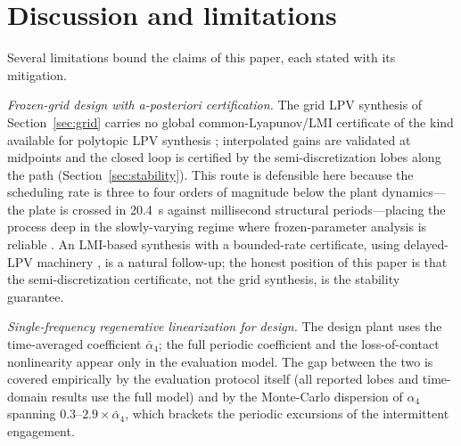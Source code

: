 \documentclass[preprint,12pt]{elsarticle}
\begin{document}
\section{Discussion and limitations}
\label{sec:discussion}

Several limitations bound the claims of this paper, each stated with
its mitigation.

\emph{Frozen-grid design with a-posteriori certification.} The grid LPV
synthesis of Section~\ref{sec:grid} carries no global
common-Lyapunov/LMI certificate of the kind available for polytopic LPV
synthesis \cite{apkarian1995self,desouza2022gain}; interpolated gains
are validated at midpoints and the closed loop is certified by the
semi-discretization lobes along the path
(Section~\ref{sec:stability}). This route is defensible here because
the scheduling rate is three to four orders of magnitude below the
plant dynamics---the plate is crossed in 20.4~s against millisecond
structural periods---placing the process deep in the slowly-varying
regime where frozen-parameter analysis is reliable
\cite{shamma1991guaranteed,rugh2000research,hoffmann2015survey}. An
LMI-based synthesis with a bounded-rate certificate, using delayed-LPV
machinery \cite{desouza2022gain}, is a natural follow-up; the honest
position of this paper is that the semi-discretization certificate, not
the grid synthesis, is the stability guarantee.

\emph{Single-frequency regenerative linearization for design.} The
design plant uses the time-averaged coefficient $\bar{\alpha}_4$; the
full periodic coefficient and the loss-of-contact nonlinearity appear
only in the evaluation model. The gap between the two is covered
empirically by the evaluation protocol itself (all reported lobes and
time-domain results use the full model) and by the Monte-Carlo
dispersion of $\alpha_4$ spanning $0.3$--$2.9 \times \bar{\alpha}_4$,
which brackets the periodic excursions of the intermittent engagement.
\end{document}
